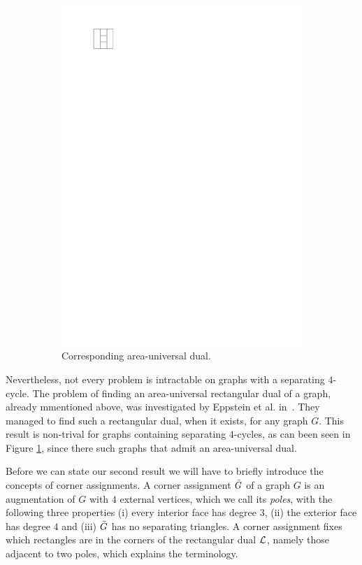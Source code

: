 \begin{figure}
\begin{subfigure}[b]{3cm}
        \includegraphics[scale=1]{introduction/img/areaunivDual.pdf}
        \caption{Corresponding area-universal dual.}
      \end{subfigure}
    \caption{}
    \label{fig:intro:areauniv}
  \end{figure}

  Nevertheless, not every problem is intractable on graphs with a separating $4$-cycle. The problem of finding an area-universal rectangular dual of a graph, already mmentioned above, was investigated by Eppstein et al. in~\cite{Eppstein2012}. They managed to find such a rectangular dual, when it exists, for any graph $G$. This result is non-trival for graphs containing separating $4$-cycles, as can been seen in Figure \ref{fig:intro:areauniv}, since there such graphs that admit an area-universal dual.


  Before we can state our second result we will have to briefly introduce the concepts of corner assignments.
  A corner assignment $\bar{G}$ of a graph $G$ is an augmentation of $G$ with $4$ external vertices, which we call its \emph{poles}, with the following three properties (i) every interior face has degree $3$, (ii) the exterior face has degree $4$ and (iii) $\bar{G}$ has no separating triangles.
  A corner assignment fixes which rectangles are in the corners of the rectangular dual $\mathcal{L}$, namely those adjacent to two poles, which explains the terminology.

